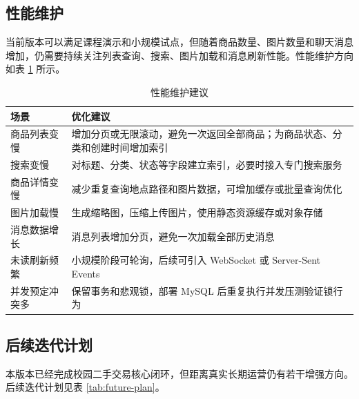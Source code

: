 ﻿\documentclass[UTF8,a4paper,12pt]{ctexart}
\begin{document}
\subsection{性能维护}
当前版本可以满足课程演示和小规模试点，但随着商品数量、图片数量和聊天消息增加，仍需要持续关注列表查询、搜索、图片加载和消息刷新性能。性能维护方向如表 \ref{tab:performance-maintenance} 所示。

\begin{table}[H]
  \centering
  \caption{性能维护建议}
  \label{tab:performance-maintenance}
  \begin{tabular}{p{3.2cm}p{9.4cm}}
    \toprule
    场景 & 优化建议 \\
    \midrule
    商品列表变慢 & 增加分页或无限滚动，避免一次返回全部商品；为商品状态、分类和创建时间增加索引 \\
    搜索变慢 & 对标题、分类、状态等字段建立索引，必要时接入专门搜索服务 \\
    商品详情变慢 & 减少重复查询地点路径和图片数据，可增加缓存或批量查询优化 \\
    图片加载慢 & 生成缩略图，压缩上传图片，使用静态资源缓存或对象存储 \\
    消息数据增长 & 消息列表增加分页，避免一次加载全部历史消息 \\
    未读刷新频繁 & 小规模阶段可轮询，后续可引入 WebSocket 或 Server-Sent Events \\
    并发预定冲突多 & 保留事务和悲观锁，部署 MySQL 后重复执行并发压测验证锁行为 \\
    \bottomrule
  \end{tabular}
\end{table}

\subsection{后续迭代计划}
本版本已经完成校园二手交易核心闭环，但距离真实长期运营仍有若干增强方向。后续迭代计划见表 \ref{tab:future-plan}。
\end{document}
